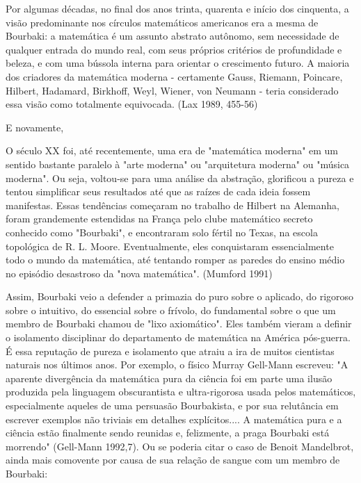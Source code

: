 \documentclass[a4paper,12pt]{article}[abntex2]
\begin{document}
Por algumas décadas, no final dos anos trinta, quarenta e início dos cinquenta, a visão predominante nos círculos matemáticos americanos era a mesma de Bourbaki: a matemática é um assunto abstrato autônomo, sem necessidade de qualquer entrada do mundo real, com seus próprios critérios de profundidade e beleza, e com uma bússola interna para orientar o crescimento futuro. A maioria dos criadores da matemática moderna - certamente Gauss, Riemann, Poincare, Hilbert, Hadamard, Birkhoff, Weyl, Wiener, von Neumann - teria considerado essa visão como totalmente equivocada. (Lax 1989, 455-56)

E novamente,

O século XX foi, até recentemente, uma era de "matemática moderna" em um sentido bastante paralelo à "arte moderna" ou "arquitetura moderna" ou "música moderna". Ou seja, voltou-se para uma análise da abstração, glorificou a pureza e tentou simplificar seus resultados até que as raízes de cada ideia fossem manifestas. Essas tendências começaram no trabalho de Hilbert na Alemanha, foram grandemente estendidas na França pelo clube matemático secreto conhecido como "Bourbaki", e encontraram solo fértil no Texas, na escola topológica de R. L. Moore. Eventualmente, eles conquistaram essencialmente todo o mundo da matemática, até tentando romper as paredes do ensino médio no episódio desastroso da "nova matemática". (Mumford 1991)

Assim, Bourbaki veio a defender a primazia do puro sobre o aplicado, do rigoroso sobre o intuitivo, do essencial sobre o frívolo, do fundamental sobre o que um membro de Bourbaki chamou de "lixo axiomático". Eles também vieram a definir o isolamento disciplinar do departamento de matemática na América pós-guerra. É essa reputação de pureza e isolamento que atraiu a ira de muitos cientistas naturais nos últimos anos. Por exemplo, o físico Murray Gell-Mann escreveu: "A aparente divergência da matemática pura da ciência foi em parte uma ilusão produzida pela linguagem obscurantista e ultra-rigorosa usada pelos matemáticos, especialmente aqueles de uma persuasão Bourbakista, e por sua relutância em escrever exemplos não triviais em detalhes explícitos.... A matemática pura e a ciência estão finalmente sendo reunidas e, felizmente, a praga Bourbaki está morrendo" (Gell-Mann 1992,7). Ou se poderia citar o caso de Benoit Mandelbrot, ainda mais comovente por causa de sua relação de sangue com um membro de Bourbaki:
\end{document}

